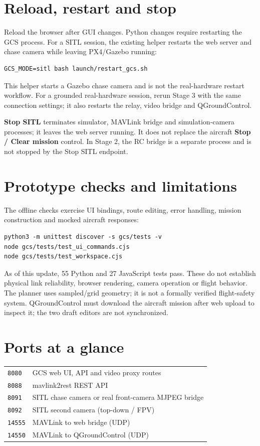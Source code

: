 \documentclass[11pt]{article}
\begin{document}
\section{Reload, restart and stop}
Reload the browser after GUI changes. Python changes require restarting the GCS
process. For a SITL session, the existing helper restarts the web server and chase
camera while leaving PX4/Gazebo running:
\begin{lstlisting}
GCS_MODE=sitl bash launch/restart_gcs.sh
\end{lstlisting}
This helper starts a Gazebo chase camera and is not the real-hardware restart
workflow. For a grounded real-hardware session, rerun Stage 3 with the same
connection settings; it also restarts the relay, video bridge and QGroundControl.

\textbf{Stop SITL} terminates simulator, MAVLink bridge and simulation-camera
processes; it leaves the web server running. It does not replace the aircraft
\textbf{Stop / Clear mission} control. In Stage 2, the RC bridge is a separate
process and is not stopped by the Stop SITL endpoint.

\section{Prototype checks and limitations}
The offline checks exercise UI bindings, route editing, error handling, mission
construction and mocked aircraft responses:
\begin{lstlisting}
python3 -m unittest discover -s gcs/tests -v
node gcs/tests/test_ui_commands.cjs
node gcs/tests/test_workspace.cjs
\end{lstlisting}
As of this update, 55 Python and 27 JavaScript tests pass. These do not establish
physical link reliability, browser rendering, camera operation or flight behavior.
The planner uses sampled/grid geometry; it is not a formally verified flight-safety
system. QGroundControl must download the aircraft mission after web upload to
inspect it; the two draft editors are not synchronized.

\section*{Ports at a glance}
\begin{tabular}{ll}
\texttt{8080} & GCS web UI, API and video proxy routes \\
\texttt{8088} & mavlink2rest REST API \\
\texttt{8091} & SITL chase camera or real front-camera MJPEG bridge \\
\texttt{8092} & SITL second camera (top-down / FPV) \\
\texttt{14555} & MAVLink to web bridge (UDP) \\
\texttt{14550} & MAVLink to QGroundControl (UDP) \\
\end{tabular}
\end{document}

